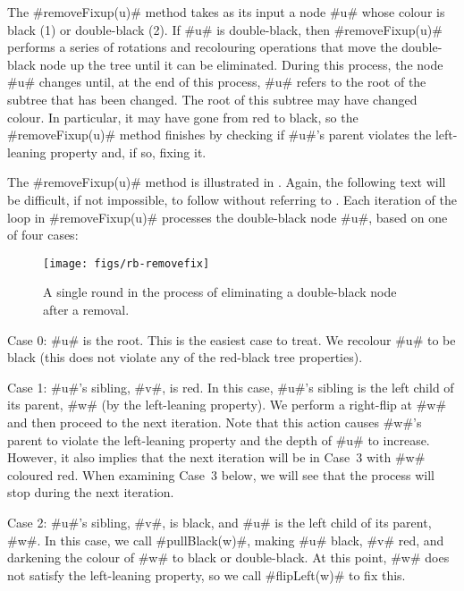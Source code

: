 The #removeFixup(u)# method takes as its input a node #u# whose colour is black
(1) or double-black (2).  If #u# is double-black, then #removeFixup(u)#
performs a series of rotations and recolouring operations that move the
double-black node up the tree until it can be eliminated.  During this
process, the node #u# changes until, at the end of this process, #u#
refers to the root of the subtree that has been changed.  The root of
this subtree may have changed colour.  In particular, it may have gone
from red to black, so the #removeFixup(u)# method finishes by checking
if #u#'s parent violates the left-leaning property and, if so, fixing it.

The #removeFixup(u)# method is illustrated in .
Again, the following text will be difficult, if not impossible, to follow
without referring to .  Each iteration of the loop
in #removeFixup(u)# processes the double-black node #u#, based on one
of four cases:

\begin{figure}
  \begin{center}
    \texttt{[image: figs/rb-removefix]}
  \end{center}
  \caption{A single round in the process of eliminating a double-black node
   after a removal.}
\end{figure}

\noindent
Case 0: #u# is the root.  This is the easiest case to treat.  We recolour
#u# to be black (this does not violate any of the red-black tree
properties).

\noindent 
Case 1: #u#'s sibling, #v#, is red.  In this case, #u#'s sibling is the
left child of its parent, #w# (by the left-leaning property).  We perform
a right-flip at #w# and then proceed to the next iteration.  Note that
this action causes #w#'s parent to violate the left-leaning property and
the depth of #u# to increase.  However, it also implies that the next
iteration will be in Case~3 with #w# coloured red.  When examining Case~3
below, we will see that the process will stop during the next iteration.

\noindent
Case 2: #u#'s sibling, #v#, is black, and #u# is the left child of its
parent, #w#.  In this case, we call #pullBlack(w)#, making #u# black,
#v# red, and darkening the colour of #w# to black or double-black.
At this point, #w# does not satisfy the left-leaning property, so we
call #flipLeft(w)# to fix this.

